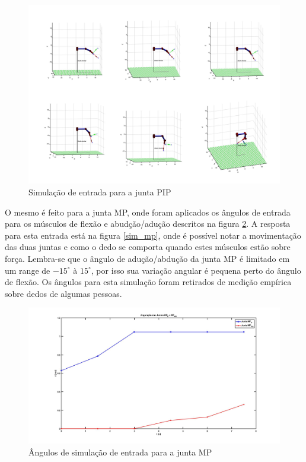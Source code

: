 \begin{figure}[H]
\centering
\includegraphics[width = 1\textwidth]{img/simpip.png}
\caption[Simulação de entrada para a junta PIP]{Simulação de entrada para a junta PIP}
\label{sim_pip}
\end{figure}

O mesmo é feito para a junta MP, onde foram aplicados os ângulos de entrada para os músculos de flexão e abudção/adução descritos na figura \ref{ang_sim_mp}. A resposta para esta entrada está na figura \ref{sim_mp}, onde é possível notar a movimentação das duas juntas e como o dedo se comporta quando estes músculos estão sobre força. Lembra-se que o ângulo de adução/abdução da junta MP é limitado em um range de $-15^\circ$ à $15^\circ$, por isso sua variação angular é pequena perto do ângulo de flexão. Os ângulos para esta simulação foram retirados de medição empírica sobre dedos de algumas pessoas.

\begin{figure}[H]
\centering
\includegraphics[width = 1\textwidth]{img/angulacao_mp.jpg}
\caption[Ângulos de simulação de entrada para a junta MP]{Ângulos de simulação de entrada para a junta MP}
\label{ang_sim_mp}
\end{figure}

